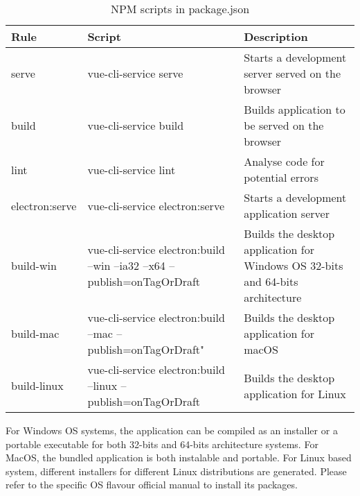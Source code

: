         \begin{table}[H]
            \centering
            \caption{NPM scripts in package.json}
            \begin{tabularx}{\linewidth}{|l|>{\raggedright}p{70mm}|X|}
            \hline
            \rowcolor[HTML]{C0C0C0}
            \textbf{Rule} & \textbf{Script} & \textbf{Description} \\ \hline
            serve & vue-cli-service serve & Starts a development server served on the browser \\ \hline
            build & vue-cli-service build & Builds application to be served on the browser \\ \hline
            lint & vue-cli-service lint & Analyse code for potential errors \\ \hline
            electron:serve & vue-cli-service electron:serve & Starts a development application server \\ \hline
            build-win & vue-cli-service electron:build --win --ia32 --x64 --publish=onTagOrDraft & Builds the desktop application for Windows OS 32-bits and 64-bits architecture \\ \hline
            build-mac & vue-cli-service electron:build --mac --publish=onTagOrDraft" & Builds the desktop application for macOS \\ \hline
            build-linux & vue-cli-service electron:build --linux --publish=onTagOrDraft & Builds the desktop application for Linux \\ \hline
            \end{tabularx}
            \label{tab:npm_scripts}
        \end{table}
    
        For Windows OS systems, the application can be compiled as an installer or a portable executable for both 32-bits and 64-bits architecture systems. For MacOS, the bundled application is both instalable and portable. For Linux based system, different installers for different Linux distributions are generated. Please refer to the specific OS flavour official manual to install its packages.
